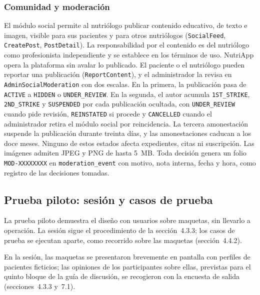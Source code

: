\documentclass[12pt, a4paper]{article}
\begin{document}
\subsubsection{Comunidad y moderación}
 
\begin{sloppypar}
El módulo social permite al nutriólogo publicar contenido educativo, de
texto e imagen, visible para sus pacientes y para otros nutriólogos
(\texttt{SocialFeed}, \texttt{CreatePost}, \texttt{PostDetail}). La
responsabilidad por el contenido es del nutriólogo como profesionista
independiente y se establece en los términos de uso. NutriApp opera la
plataforma sin avalar lo publicado. El paciente o el nutriólogo pueden
reportar una publicación (\texttt{ReportContent}), y el administrador la
revisa en \texttt{AdminSocialModeration} con dos escalas. En la primera,
la publicación pasa de \texttt{ACTIVE} a \texttt{HIDDEN} o
\texttt{UNDER\_REVIEW}. En la segunda, el autor acumula
\texttt{1ST\_STRIKE}, \texttt{2ND\_STRIKE} y \texttt{SUSPENDED} por cada
publicación ocultada, con \texttt{UNDER\_REVIEW} cuando pide revisión,
\texttt{REINSTATED} si procede y \texttt{CANCELLED} cuando el
administrador retira el módulo social por reincidencia. La tercera
amonestación suspende la publicación durante treinta días, y las
amonestaciones caducan a los doce meses. Ninguno de estos estados afecta
expedientes, citas ni suscripción. Las imágenes admiten JPEG y PNG de
hasta 5~MB. Toda decisión genera un folio \texttt{MOD-XXXXXXXX} en
\texttt{moderation\_event} con motivo, nota interna, fecha y hora, como
registro de las decisiones tomadas.
\end{sloppypar}
 
\subsection{Prueba piloto: sesión y casos de prueba}
 
La prueba piloto
demuestra el diseño con usuarios sobre maquetas, sin llevarlo a
operación. La sesión sigue el procedimiento de la
sección~4.3.3; los casos de prueba se ejecutan aparte, como recorrido
sobre las maquetas (sección~4.4.2).
 
En la sesión, las maquetas se presentaron brevemente en pantalla con
perfiles de pacientes ficticios; las opiniones de los participantes
sobre ellas, previstas para el quinto bloque de la guía de discusión,
se recogieron con la encuesta de salida (secciones~4.3.3 y~7.1).
 
\end{document}
